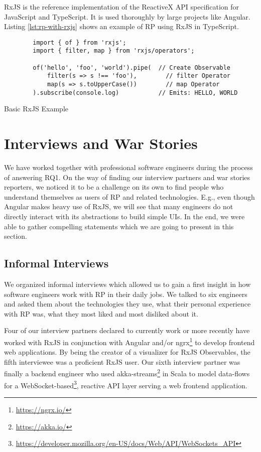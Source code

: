 \documentclass[12pt,a4paper]{article}
\begin{document}
RxJS is the reference implementation of the ReactiveX API specification for JavaScript and TypeScript. It is used thoroughly by large projects like Angular\cite{angualrrxjs}. Listing \ref{lst:rp-with-rxjs} shows an example of RP using RxJS in TypeScript.

\begin{listing}[H]
	\begin{verbatim}
		import { of } from 'rxjs';
		import { filter, map } from 'rxjs/operators';

		of('hello', 'foo', 'world').pipe(  // Create Observable
			filter(s => s !== 'foo'),        // filter Operator
			map(s => s.toUpperCase())        // map Operator
		).subscribe(console.log)           // Emits: HELLO, WORLD
	\end{verbatim}
	\caption{Basic RxJS Example}
	\label{lst:rp-with-rxjs}
\end{listing}

\section{Interviews and War Stories}
\label{sec:interviews}

We have worked together with professional software engineers during the process of answering RQ1. On the way of finding our interview partners and war stories reporters, we noticed it to be a challenge on its own to find people who understand themselves as users of RP and related technologies. E.g., even though Angular makes heavy use of RxJS, we will see that many engineers do not directly interact with its abstractions to build simple UIs. In the end, we were able to gather compelling statements which we are going to present in this section.

\subsection{Informal Interviews}

We organized informal interviews which allowed us to gain a first insight in how software engineers work with RP in their daily jobs. We talked to six engineers and asked them about the technologies they use, what their personal experience with RP was, what they most liked and most disliked about it.

Four of our interview partners declared to currently work or more recently have worked with RxJS in conjunction with Angular and/or ngrx\footnote{\url{https://ngrx.io/}} to develop frontend web applications. By being the creator of a visualizer for RxJS Observables, the fifth interviewee was a proficient RxJS user. Our sixth interview partner was finally a backend engineer who used akka-streams\footnote{\url{https://akka.io/}} in Scala to model data-flows for a WebSocket-based\footnote{\url{https://developer.mozilla.org/en-US/docs/Web/API/WebSockets_API}}, reactive API layer serving a web frontend application.
\end{document}
